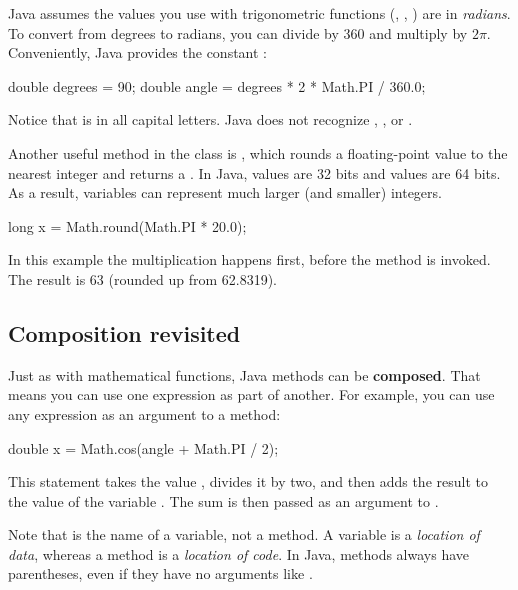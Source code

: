 
Java assumes the values you use with trigonometric functions (, , ) are in {\em radians}.
To convert from degrees to radians, you can divide by 360 and multiply by $2 \pi$.
Conveniently, Java provides the constant :

\begin{code}
    double degrees = 90;
    double angle = degrees * 2 * Math.PI / 360.0;
\end{code}

Notice that  is in all capital letters.
Java does not recognize , , or .


Another useful method in the  class is , which rounds a floating-point value to the nearest integer and returns a .
In Java,  values are 32 bits and  values are 64 bits.
As a result,  variables can represent much larger (and smaller) integers.

\begin{code}
    long x = Math.round(Math.PI * 20.0);
\end{code}

In this example the multiplication happens first, before the method is invoked.
The result is 63 (rounded up from 62.8319).

\subsection{Composition revisited}


Just as with mathematical functions, Java methods can be {\bf composed}.
That means you can use one expression as part of another.
For example, you can use any expression as an argument to a method:

\begin{code}
    double x = Math.cos(angle + Math.PI / 2);
\end{code}

This statement takes the value , divides it by two, and then adds the result to the value of the variable .
The sum is then passed as an argument to .

Note that  is the name of a variable, not a method.
A variable is a {\em location of data}, whereas a method is a {\em location of code}.
In Java, methods always have parentheses, even if they have no arguments like .

